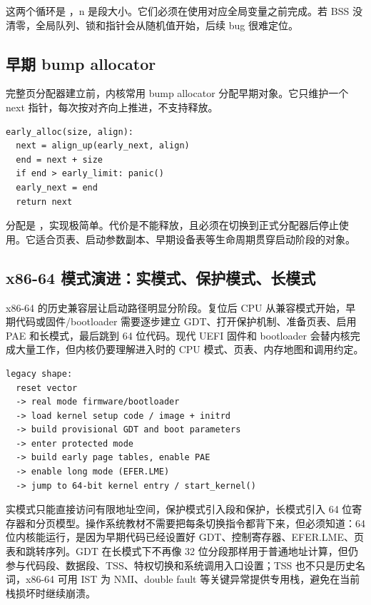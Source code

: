 这两个循环是 ，n 是段大小。它们必须在使用对应全局变量之前完成。若 BSS 没清零，全局队列、锁和指针会从随机值开始，后续 bug 很难定位。

\subsection{早期 bump allocator}

完整页分配器建立前，内核常用 bump allocator 分配早期对象。它只维护一个 next 指针，每次按对齐向上推进，不支持释放。

\begin{lstlisting}
early_alloc(size, align):
  next = align_up(early_next, align)
  end = next + size
  if end > early_limit: panic()
  early_next = end
  return next
\end{lstlisting}

分配是 ，实现极简单。代价是不能释放，且必须在切换到正式分配器后停止使用。它适合页表、启动参数副本、早期设备表等生命周期贯穿启动阶段的对象。

\subsection{x86-64 模式演进：实模式、保护模式、长模式}

x86-64 的历史兼容层让启动路径明显分阶段。复位后 CPU 从兼容模式开始，早期代码或固件/bootloader 需要逐步建立 GDT、打开保护机制、准备页表、启用 PAE 和长模式，最后跳到 64 位代码。现代 UEFI 固件和 bootloader 会替内核完成大量工作，但内核仍要理解进入时的 CPU 模式、页表、内存地图和调用约定。

\begin{lstlisting}
legacy shape:
  reset vector
  -> real mode firmware/bootloader
  -> load kernel setup code / image + initrd
  -> build provisional GDT and boot parameters
  -> enter protected mode
  -> build early page tables, enable PAE
  -> enable long mode (EFER.LME)
  -> jump to 64-bit kernel entry / start_kernel()
\end{lstlisting}

实模式只能直接访问有限地址空间，保护模式引入段和保护，长模式引入 64 位寄存器和分页模型。操作系统教材不需要把每条切换指令都背下来，但必须知道：64 位内核能运行，是因为早期代码已经设置好 GDT、控制寄存器、EFER.LME、页表和跳转序列。GDT 在长模式下不再像 32 位分段那样用于普通地址计算，但仍参与代码段、数据段、TSS、特权切换和系统调用入口设置；TSS 也不只是历史名词，x86-64 可用 IST 为 NMI、double fault 等关键异常提供专用栈，避免在当前栈损坏时继续崩溃。

